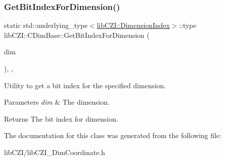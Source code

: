 \subsubsection{\texorpdfstring{Get\+Bit\+Index\+For\+Dimension()}{GetBitIndexForDimension()}}
{\footnotesize\ttfamily static std\+::underlying\+\_\+type$<$\hyperlink{namespacelib_c_z_i_a55049658acf59d0eddfaebcad16df424}{lib\+C\+Z\+I\+::\+Dimension\+Index}$>$\+::type lib\+C\+Z\+I\+::\+C\+Dim\+Base\+::\+Get\+Bit\+Index\+For\+Dimension (\begin{DoxyParamCaption}\item[{\hyperlink{namespacelib_c_z_i_a55049658acf59d0eddfaebcad16df424}{lib\+C\+Z\+I\+::\+Dimension\+Index}}]{dim }\end{DoxyParamCaption})\hspace{0.3cm}{\ttfamily [inline]}, {\ttfamily [static]}, {\ttfamily [protected]}}

Utility to get a bit index for the specified dimension. 
\begin{DoxyParams}{Parameters}
{\em dim} & The dimension. \\
\hline
\end{DoxyParams}
\begin{DoxyReturn}{Returns}
The bit index for dimension. 
\end{DoxyReturn}


The documentation for this class was generated from the following file\+:\begin{DoxyCompactItemize}
\item 
lib\+C\+Z\+I/lib\+C\+Z\+I\+\_\+\+Dim\+Coordinate.\+h\end{DoxyCompactItemize}
